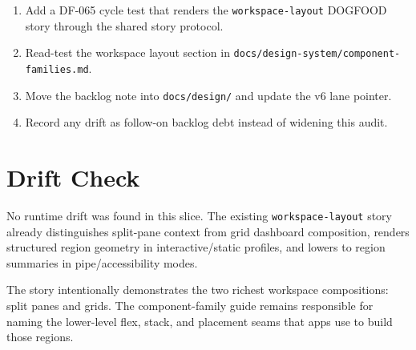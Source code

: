 \begin{enumerate}
\def\labelenumi{\arabic{enumi}.}
\tightlist
\item
  Add a DF-065 cycle test that renders the \texttt{w\allowbreak{}o\allowbreak{}r\allowbreak{}k\allowbreak{}s\allowbreak{}p\allowbreak{}a\allowbreak{}c\allowbreak{}e\allowbreak{}-\allowbreak{}l\allowbreak{}a\allowbreak{}y\allowbreak{}o\allowbreak{}u\allowbreak{}t} DOGFOOD story through the shared story protocol.
\item
  Read-test the workspace layout section in \texttt{d\allowbreak{}o\allowbreak{}c\allowbreak{}s\allowbreak{}/\allowbreak{}d\allowbreak{}e\allowbreak{}s\allowbreak{}i\allowbreak{}g\allowbreak{}n\allowbreak{}-\allowbreak{}s\allowbreak{}y\allowbreak{}s\allowbreak{}t\allowbreak{}e\allowbreak{}m\allowbreak{}/\allowbreak{}c\allowbreak{}o\allowbreak{}m\allowbreak{}p\allowbreak{}o\allowbreak{}n\allowbreak{}e\allowbreak{}n\allowbreak{}t\allowbreak{}-\allowbreak{}f\allowbreak{}a\allowbreak{}m\allowbreak{}i\allowbreak{}l\allowbreak{}i\allowbreak{}e\allowbreak{}s\allowbreak{}.\allowbreak{}m\allowbreak{}d}.
\item
  Move the backlog note into \texttt{d\allowbreak{}o\allowbreak{}c\allowbreak{}s\allowbreak{}/\allowbreak{}d\allowbreak{}e\allowbreak{}s\allowbreak{}i\allowbreak{}g\allowbreak{}n\allowbreak{}/} and update the v6 lane pointer.
\item
  Record any drift as follow-on backlog debt instead of widening this audit.
\end{enumerate}

\section{Drift Check}\label{record-106-drift-check}

No runtime drift was found in this slice. The existing \texttt{w\allowbreak{}o\allowbreak{}r\allowbreak{}k\allowbreak{}s\allowbreak{}p\allowbreak{}a\allowbreak{}c\allowbreak{}e\allowbreak{}-\allowbreak{}l\allowbreak{}a\allowbreak{}y\allowbreak{}o\allowbreak{}u\allowbreak{}t} story already distinguishes split-pane context from grid dashboard composition, renders structured region geometry in interactive/static profiles, and lowers to region summaries in pipe/accessibility modes.

The story intentionally demonstrates the two richest workspace compositions: split panes and grids. The component-family guide remains responsible for naming the lower-level flex, stack, and placement seams that apps use to build those regions.

